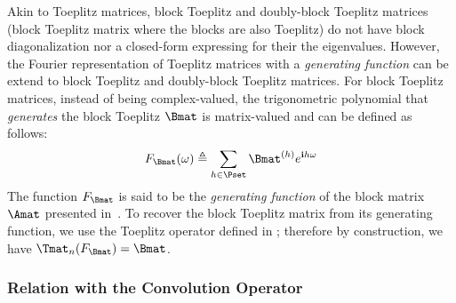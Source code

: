 Akin to Toeplitz matrices, block Toeplitz and doubly-block Toeplitz matrices (block Toeplitz matrix where the blocks are also Toeplitz) do not have block diagonalization nor a closed-form expressing for their the eigenvalues.
However, the Fourier representation of Toeplitz matrices with a \emph{generating function} can be extend to block Toeplitz and doubly-block Toeplitz matrices.
For block Toeplitz matrices, instead of being complex-valued, the trigonometric polynomial that \emph{generates} the block Toeplitz $\Bmat$ is matrix-valued and can be defined as follows:
\begin{equation}
  F_{\Bmat}(\omega) \triangleq \sum_{h \in \Pset} \Bmat^{(h)} e^{\ci h \omega}
\end{equation}
The function $F_{\Bmat}$ is said to be the \emph{generating function} of the block matrix $\Amat$ presented in~.
To recover the block Toeplitz matrix from its generating function, we use the Toeplitz operator defined in ; therefore by construction, we have $\Tmat_n(F_\Bmat) = \Bmat$.




\subsubsection{Relation with the Convolution Operator}
\label{subsubsection:ch2-relation_with_the_convolution_operator}

